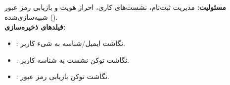 \documentclass[11pt,a4paper]{article}
\begin{document}
\subsection{}
\textbf{مسئولیت:} مدیریت ثبت‌نام، نشست‌های کاری، احراز هویت و بازیابی رمز عبور شبیه‌سازی‌شده ().\\
\textbf{فیلدهای ذخیره‌سازی:}
\begin{itemize}
    \item {}: نگاشت ایمیل/شناسه به شیء کاربر.
    \item {}: نگاشت توکن نشست به شناسه کاربر.
    \item {}: نگاشت توکن بازیابی رمز عبور.
\end{itemize}
\end{document}
